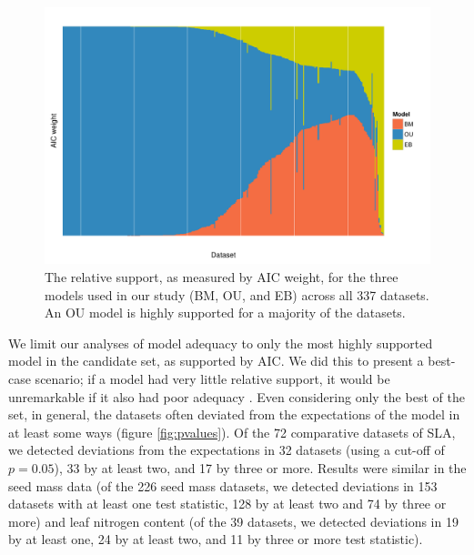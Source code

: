 \begin{figure}[p]
  \centering
  \includegraphics[width=\textwidth]{figs/aic-support}
  \caption[Relative support for models across Angiosperm datasets (ML)]{The relative support, as measured by AIC weight, for the three models used in our study (BM, OU, and EB) across all 337 datasets. An OU model is highly supported for a majority of the datasets.}
  \label{fig:aic-support}
\end{figure}
 

We limit our analyses of model adequacy to only the most highly supported model in the candidate set, as supported by AIC. We did this to present a best-case scenario; if a model had very little relative support, it would be unremarkable if it also had poor adequacy \citep[but see][]{Ripplinger2010}. Even considering only the best of the set, in general, the datasets often deviated from the expectations of the model in at least some ways (figure \ref{fig:pvalues}). 
Of the 72 comparative datasets of SLA, we detected deviations from the expectations in 32 datasets (using a cut-off of $p= 0.05$), 33 by at least two, and 17 by three or more. 
Results were similar in the seed mass data (of the 226 seed mass datasets, we detected deviations in 153 datasets with at least one test statistic, 128 by at least two and 74 by three or more) and leaf nitrogen content 
(of the 39 datasets, we detected deviations in 19 by at least one, 24 by at least two, and 11 by three or more test statistic). 

